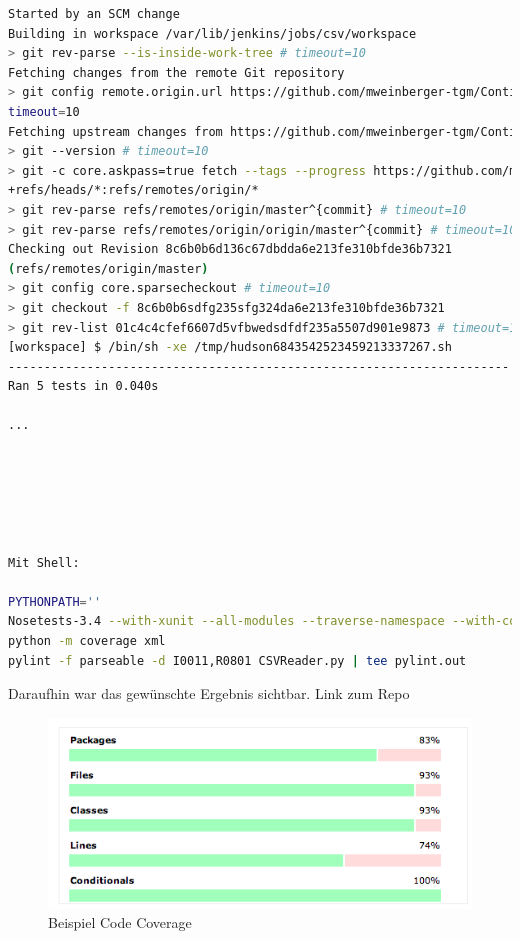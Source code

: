 \documentclass[letterpaper, 12pt]{article}
\begin{document}
\begin{lstlisting}[frame=single,language=bash, caption=Build \#1]
Started by an SCM change
Building in workspace /var/lib/jenkins/jobs/csv/workspace
> git rev-parse --is-inside-work-tree # timeout=10
Fetching changes from the remote Git repository
> git config remote.origin.url https://github.com/mweinberger-tgm/Continuous-Integration.git #
timeout=10
Fetching upstream changes from https://github.com/mweinberger-tgm/Continuous-Integration.git
> git --version # timeout=10
> git -c core.askpass=true fetch --tags --progress https://github.com/mweinberger-tgm/Continuous-Integration.git
+refs/heads/*:refs/remotes/origin/*
> git rev-parse refs/remotes/origin/master^{commit} # timeout=10
> git rev-parse refs/remotes/origin/origin/master^{commit} # timeout=10
Checking out Revision 8c6b0b6d136c67dbdda6e213fe310bfde36b7321
(refs/remotes/origin/master)
> git config core.sparsecheckout # timeout=10
> git checkout -f 8c6b0b6sdfg235sfg324da6e213fe310bfde36b7321
> git rev-list 01c4c4cfef6607d5vfbwedsdfdf235a5507d901e9873 # timeout=10
[workspace] $ /bin/sh -xe /tmp/hudson6843542523459213337267.sh
----------------------------------------------------------------------
Ran 5 tests in 0.040s

...






Mit Shell:

PYTHONPATH=''
Nosetests-3.4 --with-xunit --all-modules --traverse-namespace --with-coverage --cover-package=project1 --cover-inclusive
python -m coverage xml
pylint -f parseable -d I0011,R0801 CSVReader.py | tee pylint.out

\end{lstlisting}

Daraufhin war das gewünschte Ergebnis sichtbar. Link zum Repo \cite{repo}

\begin{figure}[!h]
	\begin{center}
		\includegraphics[width=0.7\linewidth]{images/coverage}
		\caption{Beispiel Code Coverage}
		\label{Beispiel Code Coverage}
	\end{center}
\end{figure}

\clearpage



\lstlistoflistings
\listoffigures
\end{document}
